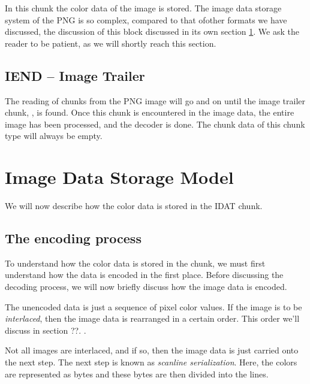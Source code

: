 In this chunk the color data of the image is stored. The image data
storage system of the PNG is so complex, compared to that ofother
formats we have discussed, the discussion of this block discussed in
its own section \ref{sec:png-image-data-storage}. We ask the reader to
be patient, as we will shortly reach this section.

\subsection{IEND -- Image Trailer}

The reading of chunks from the PNG image will go and on until the
image trailer chunk, , is found. Once this chunk is
encountered in the image data, the entire image has been processed,
and the decoder is done. The chunk data of this chunk type will always
be empty.

\section{Image Data Storage Model}
\label{sec:png-image-data-storage}

We will now describe how the color data is stored in the IDAT chunk.

\subsection{The encoding process}

To understand how the color data is stored in the \IDAT chunk, we must
first understand how the data is encoded in the first place. Before
discussing the decoding process, we will now briefly discuss how the
image data is encoded.

The unencoded data is just a sequence of pixel color values. If the
image is to be \textit{interlaced}, then the image data is rearranged in a certain
order. This order we'll discuss in section ??. .

Not all images are interlaced, and if so, then the image data is just
carried onto the next step. The next step is known as \textit{scanline
  serialization}. Here, the colors are represented as bytes and these
bytes are then divided into the lines.

\newcommand{\checkerimg}{
  \tikz[scale=2]{
    \fill[gray] (0,0) rectangle (0.5ex,0.5ex);
    \fill[black] (0.5ex,0) rectangle (1.0ex,0.5ex);
    \fill[black] (0,0.5ex) rectangle (0.5ex,1.0ex);
    \fill[gray] (0.5ex,0.5ex) rectangle (1.0ex,1.0ex);
  }}

